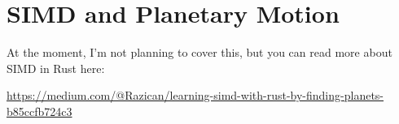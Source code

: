 \section*{SIMD and Planetary Motion}

At the moment, I'm not planning to cover this, but you can read more about SIMD
in Rust here:
\begin{center}
\url{https://medium.com/@Razican/learning-simd-with-rust-by-finding-planets-b85ccfb724c3}
\end{center}




